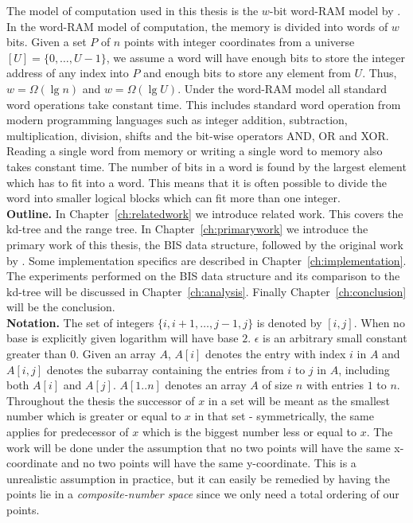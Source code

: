 The model of computation used in this thesis is the $w$-bit word-RAM model by \citet{fredman}. In the word-RAM model of computation, the memory is divided into words of $w$ bits. Given a set $P$ of $n$ points with integer coordinates from a universe $[U] = \{0, \dotsc, U-1\}$, we assume a word will have enough bits to store the integer address of any index into $P$ and enough bits to store any element from $U$. Thus, $w = \Omega(\lg n)$ and $w = \Omega(\lg U)$. Under the word-RAM model all standard word operations take constant time. This includes standard word operation from modern programming languages such as integer addition, subtraction, multiplication, division, shifts and the bit-wise operators AND, OR and XOR. Reading a single word from memory or writing a single word to memory also takes constant time. The number of bits in a word is found by the largest element which has to fit into a word. This means that it is often possible to divide the word into smaller logical blocks which can fit more than one integer. \\ 


\noindent \textbf{Outline.} In Chapter~\ref{ch:relatedwork} we introduce related work. This covers the kd-tree and the range tree. In Chapter~\ref{ch:primarywork} we introduce the primary work of this thesis, the BIS data structure, followed by the original work by \citet{chanetal}. Some implementation specifics are described in Chapter~\ref{ch:implementation}. The experiments performed on the BIS data structure and its comparison to the kd-tree will be discussed in Chapter~\ref{ch:analysis}. Finally Chapter~\ref{ch:conclusion} will be the conclusion.  \\

\noindent \textbf{Notation.} The set of integers $\{i, i+1, \dotsc, j-1, j\}$ is denoted by $[i,j]$. When no base is explicitly given logarithm will have base $2$. $\epsilon$ is an arbitrary small constant greater than $0$. Given an array $A$, $A[i]$ denotes the entry with index $i$ in $A$ and $A[i,j]$ denotes the subarray containing the entries from $i$ to $j$ in $A$, including both $A[i]$ and $A[j]$. $A[1..n]$ denotes an array $A$ of size $n$ with entries $1$ to $n$. Throughout the thesis the successor of $x$ in a set will be meant as the smallest number which is greater or equal to $x$ in that set - symmetrically, the same applies for predecessor of $x$ which is the biggest number less or equal to $x$. The work will be done under the assumption that no two points will  have the same x-coordinate and no two points will have the same y-coordinate. This is a unrealistic assumption in practice, but it can easily be remedied by having the points lie in a \emph{composite-number space} since we only need a total ordering of our points.



